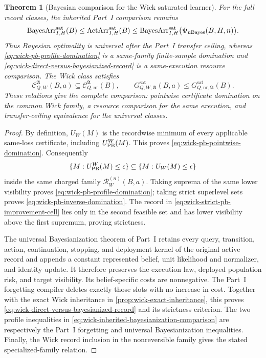 \documentclass[11pt]{article}
\numberwithin{section}{part}
\theoremstyle{plain}
\newtheorem{theorem}{Theorem}[section]
\theoremstyle{definition}
\theoremstyle{remark}
\begin{document}
\begin{theorem}[Bayesian comparison for the Wick saturated learner]
For the full record classes, the inherited Part~I comparison remains
\begin{equation}
 \operatorname{BayesArr}_{I,H}^{\rm sat}(B)
 \le \operatorname{ActArr}_{I,H}^{\rm sat}(B)
 \le
 \operatorname{BayesArr}_{I,H}^{\rm sat}
 \bigl(\Psi_{\rm uBayes}(B,H,n)\bigr).
 \label{eq:wick-inherited-bayesianization-comparison}
\end{equation}
Thus Bayesian optimality is universal after the Part~I transfer ceiling,
whereas \eqref{eq:wick-pb-profile-domination} is a same-family finite-sample
domination and \eqref{eq:wick-direct-versus-bayesianized-record} is a
same-execution resource comparison.  The Wick class satisfies
\begin{equation}
 \label{eq:wick-profile-inclusion}
 \mathcal C_{Q,W}^{\mathfrak A}(B,a)
 \subseteq\mathcal C_{Q,\mathrm{nr}}^{\mathfrak A}(B),
 \qquad
 G_{Q,W,\mathfrak A}^{\mathrm{sat}}(B,a)
 \le G_{Q,\mathrm{nr},\mathfrak A}^{\mathrm{sat}}(B).
\end{equation}
These relations give the complete comparison: pointwise certificate
domination on the common Wick family, a resource comparison for the same
execution, and transfer-ceiling equivalence for the universal classes.
\end{theorem}

\begin{proof}
By definition, \(U_W(M)\) is the recordwise minimum of every applicable
same-loss certificate, including \(U_{\rm PB}^W(M)\).  This proves
\eqref{eq:wick-pb-pointwise-domination}.  Consequently
\[
 \{M:U_{\rm PB}^W(M)\le\epsilon\}
 \subseteq \{M:U_W(M)\le\epsilon\}
\]
inside the same charged family \(\mathscr R_W^{(n)}(B,a)\).  Taking suprema
of the same lower visibility proves
\eqref{eq:wick-pb-profile-domination}; taking strict superlevel sets proves
\eqref{eq:wick-pb-inverse-domination}.  The record in
\eqref{eq:wick-strict-pb-improvement-cell} lies only in the second feasible
set and has lower visibility above the first supremum, proving strictness.

The universal Bayesianization theorem of Part~I retains every query,
transition, action, continuation, stopping, and deployment kernel of the
original active record and appends a constant represented belief, unit
likelihood and normalizer, and identity update.  It therefore preserves the
execution law, deployed population risk, and target visibility.  Its
belief-specific costs are nonnegative.  The Part~I forgetting compiler
deletes exactly those slots with no increase in cost.  Together with the exact
Wick inheritance in \cref{prop:wick-exact-inheritance}, this proves
\eqref{eq:wick-direct-versus-bayesianized-record} and its strictness
criterion.  The two profile inequalities in
\eqref{eq:wick-inherited-bayesianization-comparison} are respectively the
Part~I forgetting and universal Bayesianization inequalities.  Finally, the
Wick record inclusion in the nonreversible family gives the stated
specialized-family relation.
\end{proof}
\end{document}
